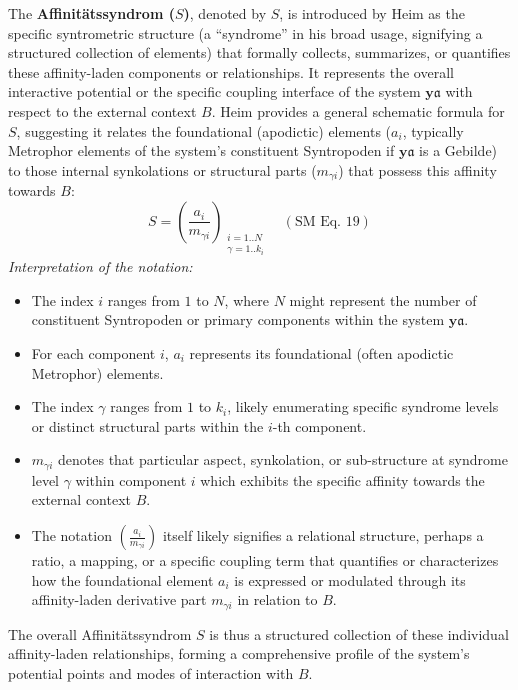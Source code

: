 \documentclass[
    12pt,              %
    a4paper,           %
    headings=normal,   %
    twoside=true,      %
    BCOR=8mm,          %
]{scrbook}
\newcommand{\q}[1]{\enquote{#1}}
\newcommand{\affinitaetssyndrom}{S}
\begin{document}
The \textbf{Affinitätssyndrom (\(\affinitaetssyndrom\))}, denoted by \(\affinitaetssyndrom\), is introduced by Heim as the specific syntrometric structure (a \q{syndrome} in his broad usage, signifying a structured collection of elements) that formally collects, summarizes, or quantifies these affinity-laden components or relationships. It represents the overall interactive potential or the specific coupling interface of the system \(\bm{y\mathfrak{a}}\) with respect to the external context \(B\). Heim provides a general schematic formula for \(\affinitaetssyndrom\), suggesting it relates the foundational (apodictic) elements (\(a_i\), typically Metrophor elements of the system's constituent Syntropoden if \(\bm{y\mathfrak{a}}\) is a Gebilde) to those internal synkolations or structural parts (\(m_{\gamma i}\)) that possess this affinity towards \(B\):
\begin{equation} \label{eq:original_affinitaetssyndrom_general_revised_2} 
\affinitaetssyndrom = \left( \frac{a_i}{m_{\gamma i}} \right)_{\substack{i=1..N \\ \gamma=1..k_i}} \quad (\text{SM Eq. 19})
\end{equation}
\textit{Interpretation of the notation:}
\begin{itemize}
    \item   The index \(i\) ranges from \(1\) to \(N\), where \(N\) might represent the number of constituent Syntropoden or primary components within the system \(\bm{y\mathfrak{a}}\).
    \item   For each component \(i\), \(a_i\) represents its foundational (often apodictic Metrophor) elements.
    \item   The index \(\gamma\) ranges from \(1\) to \(k_i\), likely enumerating specific syndrome levels or distinct structural parts within the \(i\)-th component.
    \item   \(m_{\gamma i}\) denotes that particular aspect, synkolation, or sub-structure at syndrome level \(\gamma\) within component \(i\) which exhibits the specific affinity towards the external context \(B\).
    \item   The notation \((\frac{a_i}{m_{\gamma i}})\) itself likely signifies a relational structure, perhaps a ratio, a mapping, or a specific coupling term that quantifies or characterizes how the foundational element \(a_i\) is expressed or modulated through its affinity-laden derivative part \(m_{\gamma i}\) in relation to \(B\).
\end{itemize}
The overall Affinitätssyndrom \(\affinitaetssyndrom\) is thus a structured collection of these individual affinity-laden relationships, forming a comprehensive profile of the system's potential points and modes of interaction with \(B\).
\end{document}
